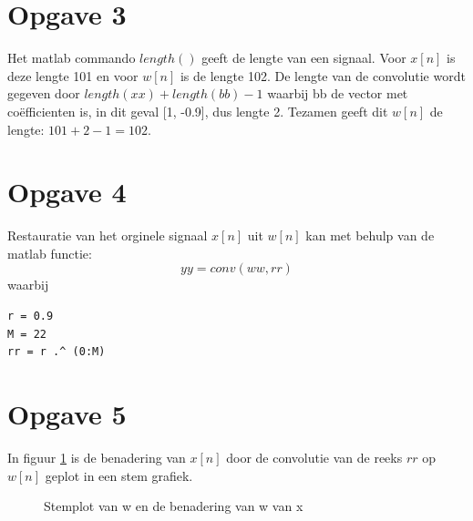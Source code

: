 \documentclass{article}
\begin{document}
\section{Opgave 3}
Het matlab commando $length()$ geeft de lengte van een signaal. Voor $x[n]$ is
deze lengte 101 en voor $w[n]$ is de lengte 102. De lengte van de convolutie
wordt gegeven door $length(xx)+length(bb)-1$ waarbij bb de vector met
co\"efficienten is, in dit geval [1, -0.9], dus lengte 2. Tezamen geeft dit $w[n]$ de lengte:  $101+2-1 = 102$.

\section{Opgave 4}
Restauratie van het orginele signaal $x[n]$ uit $w[n]$ kan met behulp van de matlab functie: 
$$yy = conv(ww, rr)$$
waarbij\\
\begin{lstlisting}
r = 0.9
M = 22 
rr = r .^ (0:M)
\end{lstlisting}

\section{Opgave 5}
In figuur \ref{opgave5} is de benadering van $x[n]$ door de convolutie van de reeks $rr$ op $w[n]$ geplot in een stem grafiek.
\begin{figure}[h]
  \centering
  \caption{Stemplot van w en de benadering van w van x}
  \label{opgave5}
\end{figure}
\newpage
\end{document}

